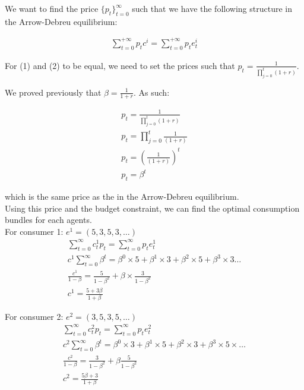 \documentclass{article}
\begin{document}
We want to find the price $\{p_t\}^{\infty}_{t=0}$ such that we have the following structure in the Arrow-Debreu equilibrium:

\begin{gather}
    \sum^{+\infty}_{t=0}p_tc^i=\sum^{+\infty}_{t=0}p_te^i_t
\end{gather}

For (1) and (2) to be equal, we need to set the prices such that $p_t=\frac{1}{\prod^t_{j=0}(1+r)}$.

We proved previously that $\beta=\frac{1}{1+r}$. As such:

\begin{gather*}
    p_t=\frac{1}{\prod^t_{j=0}(1+r)}\\
    p_t=\prod^t_{j=0}\frac{1}{(1+r)}\\
    p_t=\left(\frac{1}{(1+r)}\right)^t\\
    p_t=\beta^t
\end{gather*}

which is the same price as the in the Arrow-Debreu equilibrium.\\

Using this price and the budget constraint, we can find the optimal consumption bundles for each agents.\\

For consumer 1: $e^1=(5, 3, 5,3, \hdots)$\\

\begin{gather*}
    \sum^{\infty}_{t=0}c^1_tp_t=\sum^{\infty}_{t=0}p_te_t^1\\
    c^1\sum^{\infty}_{t=0}\beta^t=\beta^0 \times 5+\beta^1 \times 3+\beta^2 \times 5+\beta^3 \times 3 \hdots\\
    \frac{c^1}{1-\beta}=\frac{5}{1-\beta^2}+\beta  \times \frac{3}{1-\beta^2}\\
    c^1=\frac{5+3\beta}{1+\beta}
\end{gather*}

For consumer 2: $e^2=(3, 5,3,5, \hdots)$\\

\begin{gather*}
    \sum^{\infty}_{t=0}c^2_tp_t=\sum^{\infty}_{t=0}p_te_t^2\\
    c^2\sum^{\infty}_{t=0}\beta^t=\beta^0 \times 3+\beta^1 \times 5+\beta^2 \times 3+\beta^3 \times 5  \times \hdots\\
    \frac{c^2}{1-\beta}=\frac{3}{1-\beta^2}+\beta\frac{5}{1-\beta^2}\\
    c^2=\frac{5\beta+3}{1+\beta}
\end{gather*}
\end{document}
